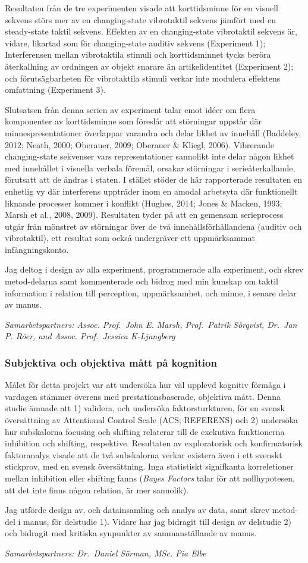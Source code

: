 \documentclass[]{article}
\begin{document}
Resultaten från de tre experimenten visade att korttidsminne för en
visuell sekvens störs mer av en changing-state vibrotaktil sekvens
jämfört med en steady-state taktil sekvens. Effekten av en
changing-state vibrotaktil sekvens är, vidare, likartad som för
changing-state auditiv sekvens (Experiment 1); Interferensen mellan
vibrotaktila stimuli och korttidsminnet tycks beröra återkallning av
ordningen av objekt snarare än artikelidentitet (Experiment 2); och
förutsägbarheten för vibrotaktila stimuli verkar inte modulera effektens
omfattning (Experiment 3).

Slutsatsen från denna serien av experiment talar emot idéer om flera
komponenter av korttidsminne som föreslår att störningar uppstår där
minnespresentationer överlappar varandra och delar likhet av innehåll
(Baddeley, 2012; Neath, 2000; Oberauer, 2009; Oberauer \& Kliegl, 2006).
Vibrerande changing-state sekvenser vars representationer sannolikt inte
delar någon likhet med innehållet i visuella verbala föremål, orsakar
störningar i serieåterkallande, förutsatt att de ändras i staten. I
stället stöder de här rapporterade resultaten en enhetlig vy där
interferens uppträder inom en amodal arbetsyta där funktionellt liknande
processer kommer i konflikt (Hughes, 2014; Jones \& Macken, 1993; Marsh
et al., 2008, 2009). Resultaten tyder på att en gemensam serieprocess
utgår från mönstret av störningar över de två innehållsförhållandena
(auditiv och vibrotaktil), ett resultat som också undergräver ett
uppmärksammat infångningskonto.

Jag deltog i design av alla experiment, programmerade alla experiment,
och skrev metod-delarna samt kommenterade och bidrog med min kunskap om
taktil information i relation till perception, uppmärksamhet, och minne,
i senare delar av manus.

\emph{Samarbetspartners: Assoc. Prof.~John E. Marsh, Prof.~Patrik
Sörqvist, Dr.~Jan P. Röer, and Assoc. Prof.~Jessica K-Ljungberg}

\subsubsection{Subjektiva och objektiva mått på
kognition}\label{subjektiva-och-objektiva-matt-pa-kognition}

Målet för detta projekt var att undersöka hur väl upplevd kognitiv
förmåga i vardagen stämmer överens med prestationsbaserade, objektiva
mått. Denna studie ämnade att 1) validera, och undersöka
faktorsturkturen, för en svensk översättning av Attentional Control
Scale (ACS; REFERENS) och 2) undersöka hur subskalorna focusing och
shifting relaterar till de exekutiva funktionerna inhibition och
shifting, respektive. Resultaten av exploratorisk och konfirmatorisk
faktoranalys visade att de två subskalorna verkar existera även i ett
svenskt stickprov, med en svensk översättning. Inga statistiskt
signifkanta korreletioner mellan inhibition eller shifting fanns
(\emph{Bayes Factors} talar för att nollhypotesen, att det inte finns
någon relation, är mer sannolik).

Jag utförde design av, och datainsamling och analys av data, samt skrev
metod-del i manus, för delstudie 1). Vidare har jag bidragit till design
av delstudie 2) och bidragit med kritiska synpunkter av sammanställande
av manus.

\emph{Samarbetspartners: Dr.~Daniel Sörman, MSc. Pia Elbe}
\end{document}
